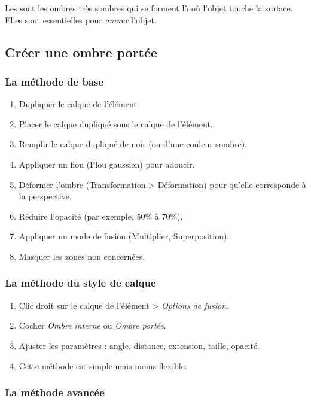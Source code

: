 Les  sont les ombres très sombres qui se forment là où l'objet touche la surface. Elles sont essentielles pour \emph{ancrer} l'objet.

\subsection{Créer une ombre portée}

\subsubsection{La méthode de base}

\begin{enumerate}
    \item Dupliquer le calque de l'élément.
    \item Placer le calque dupliqué sous le calque de l'élément.
    \item Remplir le calque dupliqué de noir (ou d'une couleur sombre).
    \item Appliquer un flou (Flou gaussien) pour adoucir.
    \item Déformer l'ombre (Transformation > Déformation) pour qu'elle corresponde à la perspective.
    \item Réduire l'opacité (par exemple, 50\% à 70\%).
    \item Appliquer un mode de fusion (Multiplier, Superposition).
    \item Masquer les zones non concernées.
\end{enumerate}

\subsubsection{La méthode du style de calque}

\begin{enumerate}
    \item Clic droit sur le calque de l'élément > \emph{Options de fusion}.
    \item Cocher \emph{Ombre interne} ou \emph{Ombre portée}.
    \item Ajuster les paramètres : angle, distance, extension, taille, opacité.
    \item Cette méthode est simple mais moins flexible.
\end{enumerate}

\subsubsection{La méthode avancée}

